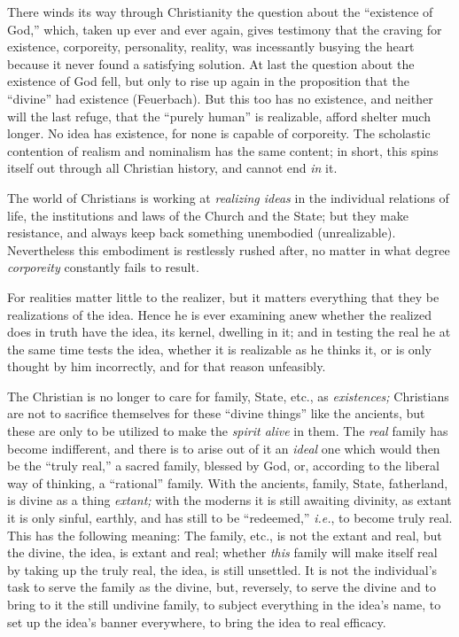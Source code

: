There winds its way through Christianity the question about the ``existence 
of God,'' which, taken up ever and ever again, gives testimony that the 
craving for existence, corporeity, personality, reality, was incessantly 
busying the heart because it never found a satisfying solution. At last the 
question about the existence of God fell, but only to rise up again in the 
proposition that the ``divine'' had existence (Feuerbach). But this too has 
no existence, and neither will the last refuge, that the ``purely human'' is 
realizable, afford shelter much longer. No idea has existence, for none is 
capable of corporeity. The scholastic contention of realism and nominalism has 
the same content; in short, this spins itself out through all Christian 
history, and cannot end \textit{in} it.

The world of Christians is working at \textit{realizing ideas} in the 
individual relations of life, the institutions and laws of the Church and the 
State; but they make resistance, and always keep back something unembodied 
(unrealizable). Nevertheless this embodiment is restlessly rushed after, no 
matter in what degree \textit{corporeity} constantly fails to result.

For realities matter little to the realizer, but it matters everything that 
they be realizations of the idea. Hence he is ever examining anew whether the 
realized does in truth have the idea, its kernel, dwelling in it; and in 
testing the real he at the same time tests the idea, whether it is realizable 
as he thinks it, or is only thought by him incorrectly, and for that reason 
unfeasibly.

The Christian is no longer to care for family, State, etc., as 
\textit{existences;} Christians are not to sacrifice themselves for these 
``divine things'' like the ancients, but these are only to be utilized to 
make the \textit{spirit alive} in them. The \textit{real} family has become 
indifferent, and there is to arise out of it an \textit{ideal} one which would 
then be the ``truly real,'' a sacred family, blessed by God, or, according 
to the liberal way of thinking, a ``rational'' family. With the ancients, 
family, State, fatherland, is divine as a thing \textit{extant;} with the 
moderns it is still awaiting divinity, as extant it is only sinful, earthly, 
and has still to be ``redeemed,'' \textit{i.e.}, to become truly real. This 
has the following meaning: The family, etc., is not the extant and real, but 
the divine, the idea, is extant and real; whether \textit{this} family will 
make itself real by taking up the truly real, the idea, is still unsettled. It 
is not the individual's task to serve the family as the divine, but, 
reversely, to serve the divine and to bring to it the still undivine family, 
to subject everything in the idea's name, to set up the idea's banner 
everywhere, to bring the idea to real efficacy.

